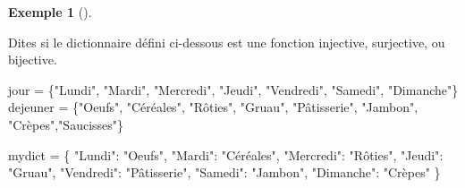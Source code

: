 \documentclass[
  letterpaper,
]{scrbook}
\newenvironment{Shaded}{}{}
\newcommand{\NormalTok}[1]{#1}
\newcommand{\OperatorTok}[1]{\textcolor[rgb]{0.40,0.40,0.40}{#1}}
\newcommand{\StringTok}[1]{\textcolor[rgb]{0.25,0.44,0.63}{#1}}
\theoremstyle{plain}
\theoremstyle{definition}
\newtheorem{example}{Exemple}[chapter]
\theoremstyle{definition}
\theoremstyle{remark}
\begin{document}
\leavevmode{}%
\begin{example}[]\label{exm-jour-dejeuner-injective}

Dites si le dictionnaire défini ci-dessous est une fonction injective,
surjective, ou bijective.

\hypertarget{dictionnaries-days-breakfast-injective}{}
\begin{Shaded}
\begin{Highlighting}[]
\NormalTok{jour }\OperatorTok{=}\NormalTok{ \{}\StringTok{"Lundi"}\NormalTok{, }\StringTok{"Mardi"}\NormalTok{, }\StringTok{"Mercredi"}\NormalTok{, }\StringTok{"Jeudi"}\NormalTok{, }\StringTok{"Vendredi"}\NormalTok{, }\StringTok{"Samedi"}\NormalTok{, }\StringTok{"Dimanche"}\NormalTok{\}}
\NormalTok{dejeuner }\OperatorTok{=}\NormalTok{ \{}\StringTok{"Oeufs"}\NormalTok{, }\StringTok{"Céréales"}\NormalTok{, }\StringTok{"Rôties"}\NormalTok{, }\StringTok{"Gruau"}\NormalTok{, }\StringTok{"Pâtisserie"}\NormalTok{, }\StringTok{"Jambon"}\NormalTok{, }\StringTok{"Crèpes"}\NormalTok{,}\StringTok{"Saucisses"}\NormalTok{\}}

\NormalTok{mydict }\OperatorTok{=}\NormalTok{ \{}
    \StringTok{"Lundi"}\NormalTok{: }\StringTok{"Oeufs"}\NormalTok{,}
    \StringTok{"Mardi"}\NormalTok{: }\StringTok{"Céréales"}\NormalTok{,}
    \StringTok{"Mercredi"}\NormalTok{: }\StringTok{"Rôties"}\NormalTok{,}
    \StringTok{"Jeudi"}\NormalTok{: }\StringTok{"Gruau"}\NormalTok{,}
    \StringTok{"Vendredi"}\NormalTok{: }\StringTok{"Pâtisserie"}\NormalTok{,}
    \StringTok{"Samedi"}\NormalTok{: }\StringTok{"Jambon"}\NormalTok{,}
    \StringTok{"Dimanche"}\NormalTok{: }\StringTok{"Crèpes"}
\NormalTok{\}}
\end{Highlighting}
\end{Shaded}

\end{example}
\end{document}
